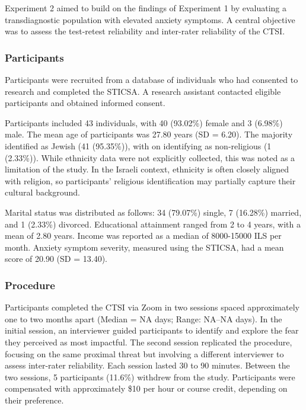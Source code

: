 \documentclass[
  man,floatsintext]{apa7}
\begin{document}
Experiment 2 aimed to build on the findings of Experiment 1 by evaluating a transdiagnostic population with elevated anxiety symptoms.
A central objective was to assess the test-retest reliability and inter-rater reliability of the CTSI.

\subsubsection{Participants}\label{participants-1}

Participants were recruited from a database of individuals who had consented to research and completed the STICSA.
A research assistant contacted eligible participants and obtained informed consent.

Participants included 43 individuals, with 40 (93.02\%) female and 3 (6.98\%) male.
The mean age of participants was 27.80 years (SD = 6.20).
The majority identified as Jewish (41 (95.35\%)), with on identifying as non-religious (1 (2.33\%)).
While ethnicity data were not explicitly collected, this was noted as a limitation of the study.
In the Israeli context, ethnicity is often closely aligned with religion, so participants' religious identification may partially capture their cultural background.

Marital status was distributed as follows: 34 (79.07\%) single, 7 (16.28\%) married, and 1 (2.33\%) divorced.
Educational attainment ranged from 2 to 4 years, with a mean of 2.80 years.
Income was reported as a median of 8000-15000 ILS per month.
Anxiety symptom severity, measured using the STICSA, had a mean score of 20.90 (SD = 13.40).

\subsubsection{Procedure}\label{procedure-1}

Participants completed the CTSI via Zoom in two sessions spaced approximately one to two months apart (Median = NA days; Range: NA--NA days).
In the initial session, an interviewer guided participants to identify and explore the fear they perceived as most impactful.
The second session replicated the procedure, focusing on the same proximal threat but involving a different interviewer to assess inter-rater reliability.
Each session lasted 30 to 90 minutes.
Between the two sessions, 5 participants (11.6\%) withdrew from the study.
Participants were compensated with approximately \$10 per hour or course credit, depending on their preference.
\end{document}
